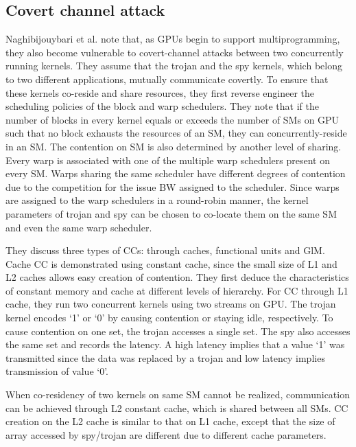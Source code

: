 \subsection{Covert channel attack}\label{sec:covertchannel}

Naghibijouybari et al. \cite{naghibijouybari2017constructing} note that, as GPUs begin to support multiprogramming, they also become vulnerable to covert-channel attacks   between two concurrently running kernels. 
They assume that the trojan and the spy kernels, which belong to two different applications,  mutually communicate covertly. To ensure  that these kernels co-reside and share resources, they first reverse engineer the scheduling policies of the block and warp schedulers. They note that if the number of blocks in every kernel equals or exceeds the number of SMs on GPU such that no block exhausts the resources of an SM, they can concurrently-reside in an SM.  
The contention on SM is also determined by another level of sharing. Every warp is associated with one of the multiple warp schedulers present on every SM. Warps sharing the same scheduler have different degrees of contention due to  the competition for the issue BW assigned to the scheduler. Since warps are assigned to the warp schedulers in a round-robin manner, the kernel parameters of trojan and spy can be chosen to co-locate them on the same SM and even the same warp scheduler. 
   
They discuss three types of CCs: through caches, functional units and GlM. Cache CC is demonstrated using constant cache, since the small size of L1 and L2 caches allows easy creation of contention. They first deduce the characteristics of constant memory and cache at different levels of hierarchy. For CC through L1 cache, they run two concurrent kernels using two streams on GPU. The trojan kernel encodes `1' or `0' by causing contention or staying idle, respectively. To cause contention on one set, the trojan accesses a single set.  The spy also accesses the same set and records the latency. A high latency implies that a value `1' was transmitted since the data was replaced by a trojan and low latency implies transmission of value `0'. 
  
When co-residency of two kernels on same SM cannot be realized, communication can be achieved through L2 constant cache, which is shared between all SMs. CC creation on the L2 cache is similar to that on L1 cache, except that the size of array accessed by spy/trojan are different due to different cache parameters.  
     
